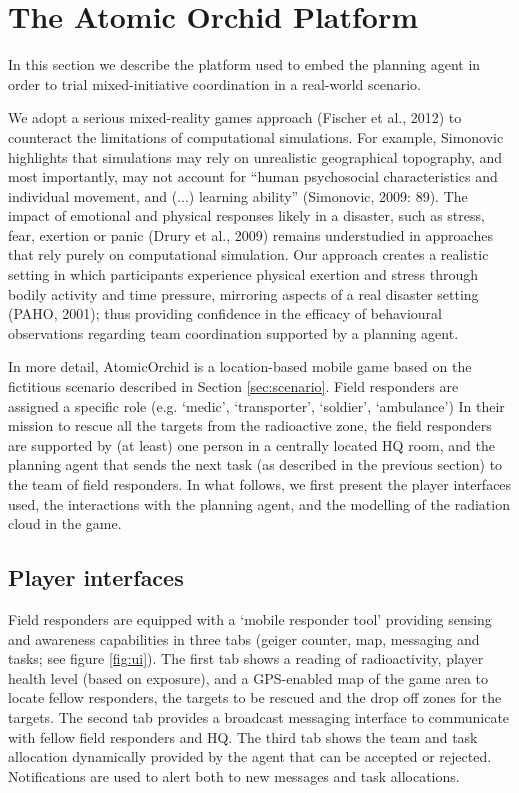 \section{The Atomic Orchid Platform}
In this section we describe the platform used to embed the planning agent in order to trial mixed-initiative coordination in a real-world scenario.


We adopt a serious mixed-reality games approach (Fischer et al., 2012) to counteract the limitations of computational simulations. For example, Simonovic highlights that simulations may rely on unrealistic geographical topography, and most importantly, may not account for ``human psychosocial characteristics and individual movement, and (...) learning ability'' (Simonovic, 2009: 89). The impact of emotional and physical responses likely in a disaster, such as stress, fear, exertion or panic (Drury et al., 2009) remains understudied in approaches that rely purely on computational simulation. Our approach creates a realistic setting in which participants experience physical exertion and stress through bodily activity and time pressure, mirroring aspects of a real disaster setting (PAHO, 2001); thus providing confidence in the efficacy of behavioural observations regarding team coordination supported by a planning agent.

In more detail, AtomicOrchid is a location-based mobile game based on the fictitious scenario described in Section \ref{sec:scenario}. Field responders are assigned a specific role (e.g. `medic', `transporter', `soldier', `ambulance') 
In their mission to rescue all the targets from the radioactive zone, the field responders are supported by (at least) one person in a centrally located HQ room, and the planning agent that sends the next task (as described in the previous section) to the team of field responders. In what follows, we first present the player interfaces used, the interactions with the planning agent, and the modelling of the radiation cloud in the game.

\subsection{Player interfaces}
Field responders are equipped with a `mobile responder tool' providing sensing and awareness capabilities in three tabs (geiger counter, map, messaging and tasks; see figure \ref{fig:ui}). The first tab shows a reading of radioactivity, player health level (based on exposure), and a GPS-enabled map of the game area to locate fellow responders, the targets to be rescued and the drop off zones for the targets. The second tab provides a broadcast messaging interface to communicate with fellow field responders and HQ. The third tab shows the team and task allocation dynamically provided by the agent that can be accepted or rejected. Notifications are used to alert both to new messages and task allocations.

